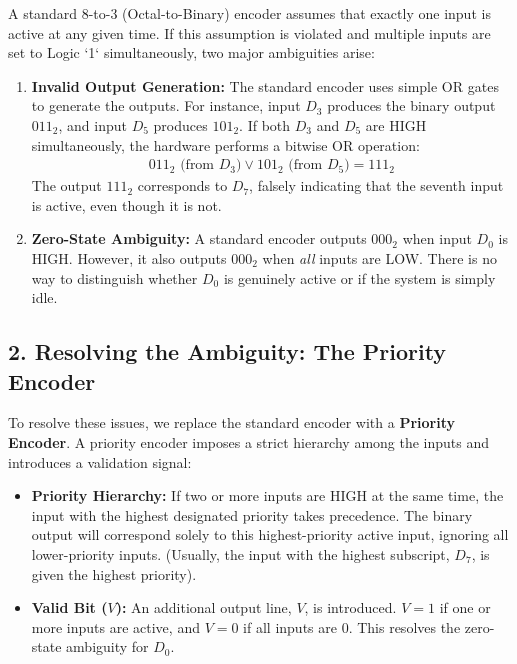 \documentclass[12pt,a3paper]{article}
\begin{document}
\begin{enumerate}
\begin{tcolorbox}[enhanced,breakable,ansbox,colback=cD!4,colframe=cD,boxrule=0.8pt,arc=5pt,title={\textbf{Answer}},fonttitle=\bfseries\color{white},colbacktitle=cD]
A standard 8-to-3 (Octal-to-Binary) encoder assumes that exactly one input is active at any given time. If this assumption is violated and multiple inputs are set to Logic `1` simultaneously, two major ambiguities arise:

\begin{enumerate}
    \item \textbf{Invalid Output Generation:} The standard encoder uses simple OR gates to generate the outputs. For instance, input $D_3$ produces the binary output $011_2$, and input $D_5$ produces $101_2$. If both $D_3$ and $D_5$ are HIGH simultaneously, the hardware performs a bitwise OR operation: 
    \begin{align*}
        011_2 \text{ (from } D_3) \lor 101_2 \text{ (from } D_5) = 111_2
    \end{align*}
    The output $111_2$ corresponds to $D_7$, falsely indicating that the seventh input is active, even though it is not.
    
    \item \textbf{Zero-State Ambiguity:} A standard encoder outputs $000_2$ when input $D_0$ is HIGH. However, it also outputs $000_2$ when \textit{all} inputs are LOW. There is no way to distinguish whether $D_0$ is genuinely active or if the system is simply idle.
\end{enumerate}

\subsection*{2. Resolving the Ambiguity: The Priority Encoder}

To resolve these issues, we replace the standard encoder with a \textbf{Priority Encoder}. A priority encoder imposes a strict hierarchy among the inputs and introduces a validation signal:

\begin{itemize}
    \item \textbf{Priority Hierarchy:} If two or more inputs are HIGH at the same time, the input with the highest designated priority takes precedence. The binary output will correspond solely to this highest-priority active input, ignoring all lower-priority inputs. (Usually, the input with the highest subscript, $D_7$, is given the highest priority).
    \item \textbf{Valid Bit ($V$):} An additional output line, $V$, is introduced. $V = 1$ if one or more inputs are active, and $V = 0$ if all inputs are $0$. This resolves the zero-state ambiguity for $D_0$.
\end{itemize}


\end{tcolorbox}
\end{enumerate}
\end{document}
